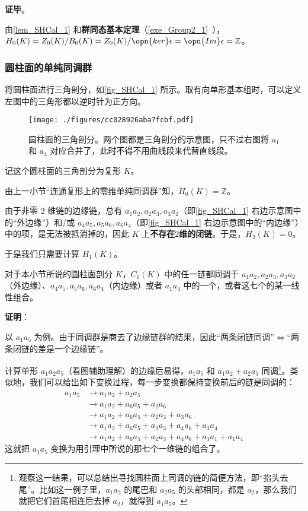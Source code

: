 \textbf{证毕}。

由\autoref{lem_SHCal_1} 和\textbf{群同态基本定理}（\autoref{exe_Group2_1}~），$H_0(K)=Z_0(K)/B_0(K)=Z_0(K)/\opn{ker}\epsilon=\opn{Im}\epsilon=\mathbb{Z}$。



\subsubsection{圆柱面的单纯同调群}

将圆柱面进行三角剖分，如\autoref{fig_SHCal_1} 所示。取有向单形基本组时，可以定义左图中的三角形都以逆时针为正方向。

\begin{figure}[ht]
\centering
\texttt{[image: ./figures/cc028926aba7fcbf.pdf]}
\caption{圆柱面的三角剖分。两个图都是三角剖分的示意图，只不过右图将 $a_1$ 和 $a_4$ 对应合并了，此时不得不用曲线段来代替直线段。} \label{fig_SHCal_1}
\end{figure}

记这个圆柱面的三角剖分为复形 $K$。

由上一小节“连通复形上的零维单纯同调群”知，$H_0(K)=\mathbb{Z}$。

由于非零 $2$ 维链的边缘链，总有 $a_1a_2, a_2a_3, a_3a_2$（即\autoref{fig_SHCal_1} 右边示意图中的“外边缘”）和/或 $a_4a_5, a_5a_6, a_6a_4$（即\autoref{fig_SHCal_1} 右边示意图中的“内边缘”）中的项，是无法被抵消掉的，因此 $K$ 上\textbf{不存在}$2$\textbf{维的闭链}。于是，$H_2(K)=0$。

于是我们只需要计算 $H_1(K)$。

\begin{lemma}{}\label{lem_SHCal_2}
对于本小节所说的圆柱面剖分 $K$，$C_1(K)$ 中的任一链都同调于 $a_1a_2, a_2a_3, a_3a_2$（外边缘）、$a_4a_5, a_5a_6, a_6a_4$（内边缘）或者 $a_1a_4$ 中的一个，或者这七个的某一线性组合。
\end{lemma}

\textbf{证明}：

以 $a_1a_5$ 为例。由于同调群是商去了边缘链群的结果，因此“两条闭链同调”$\iff$“两条闭链的差是一个边缘链”。

计算单形 $a_1a_2a_5$（看图辅助理解）的边缘后易得，$a_1a_5$ 和 $a_1a_2+a_2a_5$ 同调\footnote{观察这一结果，可以总结出寻找圆柱面上同调的链的简便方法，即“掐头去尾”。比如这一例子里，$a_1a_2$ 的尾巴和 $a_2a_5$ 的头部相同，都是 $a_2$，那么我们就把它们首尾相连后去掉 $a_2$，就得到 $a_1a_5$。}。类似地，我们可以给出如下变换过程，每一步变换都保持变换前后的链是同调的：
\begin{equation}\label{eq_SHCal_1}
\begin{aligned}
a_1a_5&\to a_1a_2+a_2a_5\\
&\to a_1a_2+a_6a_5+a_2a_6\\
&\to a_1a_2+a_6a_5+a_2a_3+a_3a_6\\&
\to a_1a_2+a_6a_5+a_2a_3+a_4a_6+a_3a_4\\
&\to a_1a_2+a_6a_5+a_2a_3+a_4a_6+a_3a_1+a_1a_4
\end{aligned}
\end{equation}
这就把 $a_1a_5$ 变换为用引理中所说的那七个一维链的组合了。

